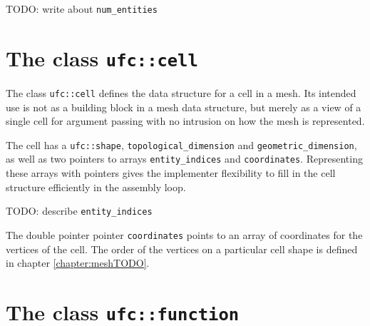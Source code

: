 TODO: write about \texttt{num\_entities}


\section{The class \texttt{ufc::cell}}

The class \texttt{ufc::cell} defines the data structure for a cell in a mesh.
Its intended use is not as a building block in a mesh data structure, but merely as a view
of a single cell for argument passing with no intrusion on how the mesh is represented.










The cell has a \texttt{ufc::shape}, \texttt{topological\_dimension} and \texttt{geometric\_dimension},
as well as two pointers to arrays \texttt{entity\_indices} and \texttt{coordinates}.
Representing these arrays with pointers gives the implementer flexibility
to fill in the cell structure efficiently in the assembly loop.

TODO: describe 
\texttt{entity\_indices}

The double pointer pointer \texttt{coordinates} points to an array of coordinates for the vertices of the cell.
The order of the vertices on a particular cell shape is defined in chapter \ref{chapter:meshTODO}.


\section{The class \texttt{ufc::function}}

